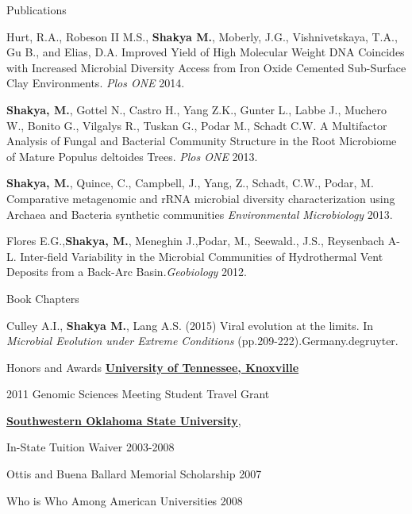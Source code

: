 \documentclass{resume} %
\begin{document}
\begin{rSection}{Publications}
\item Hurt, R.A., Robeson II M.S., \textbf{Shakya M.}, Moberly, J.G., Vishnivetskaya, T.A., Gu B., and Elias, D.A. Improved Yield of High Molecular Weight DNA Coincides with Increased Microbial Diversity Access from Iron Oxide Cemented Sub-Surface Clay Environments. \textit{Plos ONE} 2014.
 \item \textbf{Shakya, M.}, Gottel N., Castro H., Yang Z.K., Gunter L., Labbe J., Muchero W., Bonito G., Vilgalys R., Tuskan G., Podar M., Schadt C.W. A Multifactor Analysis of Fungal and Bacterial Community Structure in the Root Microbiome of Mature Populus deltoides Trees. \textit{Plos ONE} 2013. 
\item \textbf{Shakya, M.}, Quince, C., Campbell, J., Yang, Z., Schadt, C.W., Podar, M. Comparative metagenomic and rRNA microbial diversity characterization using Archaea and Bacteria synthetic communities \textit{Environmental Microbiology} 2013.
\item Flores E.G.,\textbf{Shakya, M.}, Meneghin J.,Podar, M., Seewald., J.S., Reysenbach A-L. Inter-field Variability in the Microbial Communities of Hydrothermal Vent Deposits from a Back-Arc Basin.\textit{Geobiology} 2012. 
\end{rSection}


\begin{rSection}{Book Chapters}
\item Culley A.I., \textbf{Shakya M.}, Lang A.S. (2015) Viral evolution at the limits. In \textit{Microbial Evolution under Extreme Conditions} (pp.209-222).Germany.degruyter.
\end{rSection}


\begin{rSection}{Honors and Awards}
\href{http://www.utk.edu}{\textbf{University of Tennessee, Knoxville}}
\item 2011 Genomic Sciences Meeting Student Travel Grant

\item \href{http://www.swosu.edu}{\textbf{Southwestern Oklahoma State University}},
\item In-State Tuition Waiver 2003-2008
\item Ottis and Buena Ballard Memorial Scholarship 2007
\item Who is Who Among American Universities 2008
\end{rSection}
\end{document}
